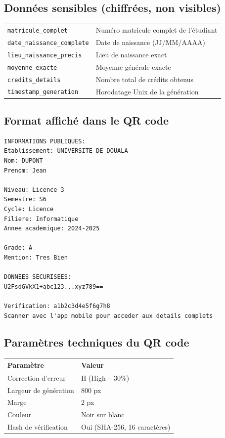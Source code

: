 \documentclass[a4paper,11pt]{article}
\begin{document}
\subsection{Donn\'ees sensibles (chiffr\'ees, non visibles)}

\begin{tcolorbox}[colback=red!5, colframe=encryptedred, title={\textcolor{encryptedred}{\textbf{Champs chiffr\'es (AES-256-CBC)}}}]
\begin{longtable}{p{5cm}p{7.5cm}}
\texttt{matricule\_complet} & Num\'ero matricule complet de l'\'etudiant \\
\texttt{date\_naissance\_complete} & Date de naissance (JJ/MM/AAAA) \\
\texttt{lieu\_naissance\_precis} & Lieu de naissance exact \\
\texttt{moyenne\_exacte} & Moyenne g\'en\'erale exacte \\
\texttt{credits\_details} & Nombre total de cr\'edits obtenus \\
\texttt{timestamp\_generation} & Horodatage Unix de la g\'en\'eration \\
\end{longtable}
\end{tcolorbox}

\subsection{Format affich\'e dans le QR code}

\begin{lstlisting}[title={Contenu du QR code -- Relev\'e de notes}]
INFORMATIONS PUBLIQUES:
Etablissement: UNIVERSITE DE DOUALA
Nom: DUPONT
Prenom: Jean

Niveau: Licence 3
Semestre: S6
Cycle: Licence
Filiere: Informatique
Annee academique: 2024-2025

Grade: A
Mention: Tres Bien

DONNEES SECURISEES:
U2FsdGVkX1+abc123...xyz789==

Verification: a1b2c3d4e5f6g7h8
Scanner avec l'app mobile pour acceder aux details complets
\end{lstlisting}

\subsection{Param\`etres techniques du QR code}

\begin{center}
\begin{tabular}{ll}
\toprule
\textbf{Param\`etre} & \textbf{Valeur} \\
\midrule
Correction d'erreur & H (High -- 30\%) \\
Largeur de g\'en\'eration & 800 px \\
Marge & 2 px \\
Couleur & Noir sur blanc \\
Hash de v\'erification & Oui (SHA-256, 16 caract\`eres) \\
\bottomrule
\end{tabular}
\end{center}
\end{document}
